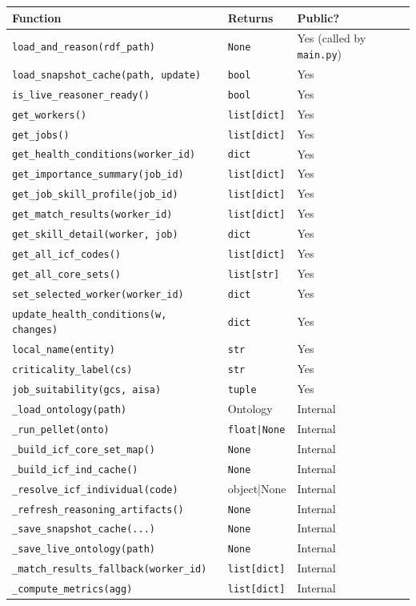 ﻿\documentclass[12pt,a4paper]{article}
\begin{document}
\begin{longtable}{@{}P{6.5cm}P{3cm}P{5.5cm}@{}}
\toprule
\textbf{Function} & \textbf{Returns} & \textbf{Public?} \\
\midrule
\endhead
\texttt{load\_and\_reason(rdf\_path)} & \texttt{None} & Yes (called by \texttt{main.py}) \\
\texttt{load\_snapshot\_cache(path, update)} & \texttt{bool} & Yes \\
\texttt{is\_live\_reasoner\_ready()} & \texttt{bool} & Yes \\
\texttt{get\_workers()} & \texttt{list[dict]} & Yes \\
\texttt{get\_jobs()} & \texttt{list[dict]} & Yes \\
\texttt{get\_health\_conditions(worker\_id)} & \texttt{dict} & Yes \\
\texttt{get\_importance\_summary(job\_id)} & \texttt{list[dict]} & Yes \\
\texttt{get\_job\_skill\_profile(job\_id)} & \texttt{list[dict]} & Yes \\
\texttt{get\_match\_results(worker\_id)} & \texttt{list[dict]} & Yes \\
\texttt{get\_skill\_detail(worker, job)} & \texttt{dict} & Yes \\
\texttt{get\_all\_icf\_codes()} & \texttt{list[dict]} & Yes \\
\texttt{get\_all\_core\_sets()} & \texttt{list[str]} & Yes \\
\texttt{set\_selected\_worker(worker\_id)} & \texttt{dict} & Yes \\
\texttt{update\_health\_conditions(w, changes)} & \texttt{dict} & Yes \\
\texttt{local\_name(entity)} & \texttt{str} & Yes \\
\texttt{criticality\_label(cs)} & \texttt{str} & Yes \\
\texttt{job\_suitability(gcs, aisa)} & \texttt{tuple} & Yes \\
\texttt{\_load\_ontology(path)} & Ontology & Internal \\
\texttt{\_run\_pellet(onto)} & \texttt{float|None} & Internal \\
\texttt{\_build\_icf\_core\_set\_map()} & \texttt{None} & Internal \\
\texttt{\_build\_icf\_ind\_cache()} & \texttt{None} & Internal \\
\texttt{\_resolve\_icf\_individual(code)} & object|None & Internal \\
\texttt{\_refresh\_reasoning\_artifacts()} & \texttt{None} & Internal \\
\texttt{\_save\_snapshot\_cache(...)} & \texttt{None} & Internal \\
\texttt{\_save\_live\_ontology(path)} & \texttt{None} & Internal \\
\texttt{\_match\_results\_fallback(worker\_id)} & \texttt{list[dict]} & Internal \\
\texttt{\_compute\_metrics(agg)} & \texttt{list[dict]} & Internal \\
\bottomrule
\end{longtable}
\end{document}
